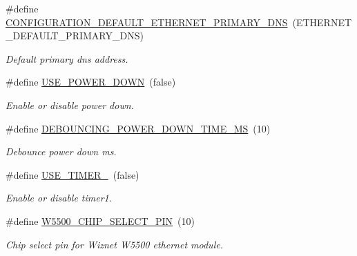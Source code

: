 \begin{DoxyCompactItemize}
\mbox{\label{rmap-config_8h_a7e0faf050a00ee299bd47f28d9b38c63}} 
\#define \hyperlink{rmap-config_8h_a7e0faf050a00ee299bd47f28d9b38c63}{C\+O\+N\+F\+I\+G\+U\+R\+A\+T\+I\+O\+N\+\_\+\+D\+E\+F\+A\+U\+L\+T\+\_\+\+E\+T\+H\+E\+R\+N\+E\+T\+\_\+\+P\+R\+I\+M\+A\+R\+Y\+\_\+\+D\+NS}~(E\+T\+H\+E\+R\+N\+E\+T\+\_\+\+D\+E\+F\+A\+U\+L\+T\+\_\+\+P\+R\+I\+M\+A\+R\+Y\+\_\+\+D\+NS)
\begin{DoxyCompactList}\small\item\em Default primary dns address. \end{DoxyCompactList}\item 
\mbox{\label{rmap-config_8h_a9ace81994cbeb6153f9dd5adf0e6dbee}} 
\#define \hyperlink{rmap-config_8h_a9ace81994cbeb6153f9dd5adf0e6dbee}{U\+S\+E\+\_\+\+P\+O\+W\+E\+R\+\_\+\+D\+O\+WN}~(false)
\begin{DoxyCompactList}\small\item\em Enable or disable power down. \end{DoxyCompactList}\item 
\mbox{\label{rmap-config_8h_a7b9497e328b8f872cd7677cfd02bbf65}} 
\#define \hyperlink{rmap-config_8h_a7b9497e328b8f872cd7677cfd02bbf65}{D\+E\+B\+O\+U\+N\+C\+I\+N\+G\+\_\+\+P\+O\+W\+E\+R\+\_\+\+D\+O\+W\+N\+\_\+\+T\+I\+M\+E\+\_\+\+MS}~(10)
\begin{DoxyCompactList}\small\item\em Debounce power down ms. \end{DoxyCompactList}\item 
\mbox{\label{rmap-config_8h_a8051c2a569a9f9c488af89bce47ec306}} 
\#define \hyperlink{rmap-config_8h_a8051c2a569a9f9c488af89bce47ec306}{U\+S\+E\+\_\+\+T\+I\+M\+E\+R\+\_}~(false)
\begin{DoxyCompactList}\small\item\em Enable or disable timer1. \end{DoxyCompactList}\item 
\mbox{\label{rmap-config_8h_a487cf0916151ca6772bc10ad17de96f8}} 
\#define \hyperlink{rmap-config_8h_a487cf0916151ca6772bc10ad17de96f8}{W5500\+\_\+\+C\+H\+I\+P\+\_\+\+S\+E\+L\+E\+C\+T\+\_\+\+P\+IN}~(10)
\begin{DoxyCompactList}\small\item\em Chip select pin for Wiznet W5500 ethernet module. \end{DoxyCompactList}\item 

\end{DoxyCompactItemize}
